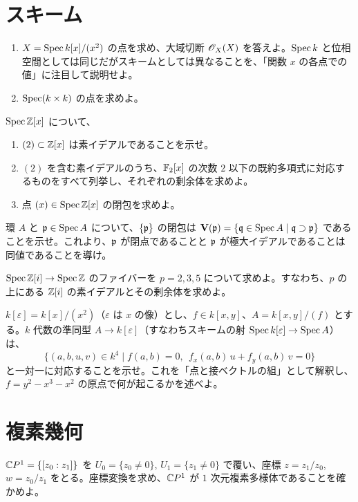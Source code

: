 \section{スキーム}

\begin{enumerate}
  \item $X=\operatorname{Spec} k[x]/(x^2)$ の点を求め、大域切断 $\mathscr{O}_X(X)$ を答えよ。$\operatorname{Spec} k$ と位相空間としては同じだがスキームとしては異なることを、「関数 $x$ の各点での値」に注目して説明せよ。
  \item $\operatorname{Spec}(k\times k)$ の点を求めよ。
\end{enumerate}

$\operatorname{Spec}\mathbb{Z}[x]$ について、
\begin{enumerate}
  \item $(2)\subset\mathbb{Z}[x]$ は素イデアルであることを示せ。
  \item $(2)$ を含む素イデアルのうち、$\mathbb{F}_2[x]$ の次数 $2$ 以下の既約多項式に対応するものをすべて列挙し、それぞれの剰余体を求めよ。
  \item 点 $(x)\in\operatorname{Spec}\mathbb{Z}[x]$ の閉包を求めよ。
\end{enumerate}

環 $A$ と $\mathfrak{p}\in\operatorname{Spec} A$ について、$\{\mathfrak{p}\}$ の閉包は $\mathbf{V}(\mathfrak{p})=\{\mathfrak{q}\in\operatorname{Spec} A\mid \mathfrak{q}\supset\mathfrak{p}\}$ であることを示せ。これより、$\mathfrak{p}$ が閉点であることと $\mathfrak{p}$ が極大イデアルであることは同値であることを導け。

$\operatorname{Spec}\mathbb{Z}[i]\to\operatorname{Spec}\mathbb{Z}$ のファイバーを $p=2,3,5$ について求めよ。すなわち、$p$ の上にある $\mathbb{Z}[i]$ の素イデアルとその剰余体を求めよ。

$k[\varepsilon]=k[x]/(x^2)$（$\varepsilon$ は $x$ の像）とし、$f\in k[x,y]$、$A=k[x,y]/(f)$ とする。$k$ 代数の準同型 $A\to k[\varepsilon]$（すなわちスキームの射 $\operatorname{Spec} k[\varepsilon]\to\operatorname{Spec} A$）は、
\[
  \{(a,b,u,v)\in k^4\mid f(a,b)=0,\ \ f_x(a,b)\,u+f_y(a,b)\,v=0\}
\]
と一対一に対応することを示せ。これを「点と接ベクトルの組」として解釈し、$f=y^2-x^3-x^2$ の原点で何が起こるかを述べよ。

\section{複素幾何}

$\mathbb{C} P^1=\{[z_0:z_1]\}$ を $U_0=\{z_0\neq 0\}$, $U_1=\{z_1\neq 0\}$ で覆い、座標 $z=z_1/z_0$, $w=z_0/z_1$ をとる。座標変換を求め、$\mathbb{C} P^1$ が $1$ 次元複素多様体であることを確かめよ。

